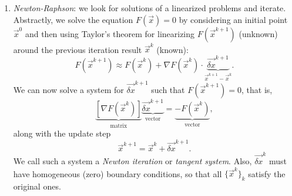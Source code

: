\begin{enumerate}
    \item \emph{Newton-Raphson}: we look for solutions of a linearized problems and iterate. Abstractly, we solve the equation $F(\vec x)=0$ by considering an initial point $\vec x^0$ and then using Taylor's theorem for linearizing $F(\vec x^{k+1})$ (unknown) around the previous iteration result $\vec x^k$ (known):
    \begin{equation*}
        F(\vec x^{k+1}) \approx F(\vec x^k) + \nabla F(\vec x^k)\cdot \underbrace{\vec{\delta x}^{k+1}}_{\vec x^{k+1} - \vec{x}^k}.
    \end{equation*}
    We can now solve a system for $\vec{\delta x}^{k+1}$ such that $F(\vec x^{k+1}) = 0$, that is,
    \begin{equation*}
        \underbrace{[\nabla F(\vec x^k)]}_{\text{matrix}} \underbrace{\vec{\delta x}^{k+1}}_{\text{vector}} = \underbrace{-F(\vec x^k)}_{\text{vector}},
    \end{equation*}
    along with the update step
    \begin{equation*}
        \vec x^{k+1} = \vec{x}^k + \vec{\delta x}^{k+1}.
    \end{equation*}
    We call such a system a \emph{Newton iteration} or \emph{tangent system}. Also, $\vec{\delta x}^{k}$ must have homogeneous (zero) boundary conditions, so that all $\{\vec x^{k}\}_k$ satisfy the original ones. 
    

\end{enumerate}
